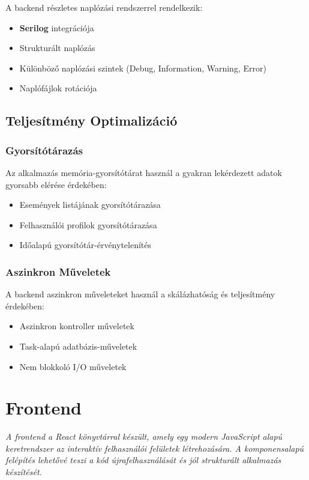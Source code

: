 \documentclass[colorlinks]{thesis-kando}
\theoremstyle{definition}
\theoremstyle{remark}
\begin{document}
 A backend részletes naplózási rendszerrel rendelkezik:
 
 \begin{itemize}
 	\item \textbf{Serilog} integrációja
 	\item Strukturált naplózás
 	\item Különböző naplózási szintek (Debug, Information, Warning, Error)
 	\item Naplófájlok rotációja
 \end{itemize}
 
 \subsection{Teljesítmény Optimalizáció}
 
 \subsubsection{Gyorsítótárazás}
 
 Az alkalmazás memória-gyorsítótárat használ a gyakran lekérdezett adatok gyorsabb elérése érdekében:
 
 \begin{itemize}
 	\item Események listájának gyorsítótárazása
 	\item Felhasználói profilok gyorsítótárazása
 	\item Időalapú gyorsítótár-érvénytelenítés
 \end{itemize}
 
 \subsubsection{Aszinkron Műveletek}
 
 A backend aszinkron műveleteket használ a skálázhatóság és teljesítmény érdekében:
 
 \begin{itemize}
 	\item Aszinkron kontroller műveletek
 	\item Task-alapú adatbázis-műveletek
 	\item Nem blokkoló I/O műveletek
 \end{itemize}
 
 \section{Frontend}
 \noindent 
 \textit{A frontend a React könyvtárral készült, amely egy modern JavaScript alapú keretrendszer az interaktív felhasználói felületek létrehozására. A komponensalapú felépítés lehetővé teszi a kód újrafelhasználását és jól strukturált alkalmazás készítését.}
 
\end{document}
